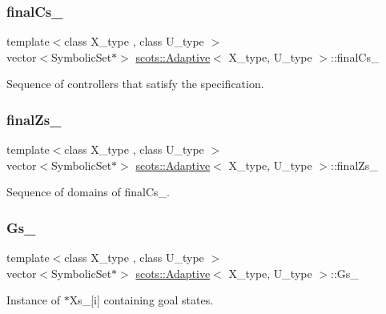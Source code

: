 \subsubsection{\texorpdfstring{final\+Cs\+\_\+}{finalCs\_}}
{\footnotesize\ttfamily template$<$class X\+\_\+type , class U\+\_\+type $>$ \\
vector$<$Symbolic\+Set$\ast$$>$ \hyperlink{classscots_1_1Adaptive}{scots\+::\+Adaptive}$<$ X\+\_\+type, U\+\_\+type $>$\+::final\+Cs\+\_\+}

Sequence of controllers that satisfy the specification. \mbox{\label{classscots_1_1Adaptive_af22209ae22c8b2dd921be22cc51a36dd}} 
\subsubsection{\texorpdfstring{final\+Zs\+\_\+}{finalZs\_}}
{\footnotesize\ttfamily template$<$class X\+\_\+type , class U\+\_\+type $>$ \\
vector$<$Symbolic\+Set$\ast$$>$ \hyperlink{classscots_1_1Adaptive}{scots\+::\+Adaptive}$<$ X\+\_\+type, U\+\_\+type $>$\+::final\+Zs\+\_\+}

Sequence of domains of final\+Cs\+\_\+. \mbox{\label{classscots_1_1Adaptive_a4184aca345cd09023c656bc616c2ee9a}} 
\subsubsection{\texorpdfstring{Gs\+\_\+}{Gs\_}}
{\footnotesize\ttfamily template$<$class X\+\_\+type , class U\+\_\+type $>$ \\
vector$<$Symbolic\+Set$\ast$$>$ \hyperlink{classscots_1_1Adaptive}{scots\+::\+Adaptive}$<$ X\+\_\+type, U\+\_\+type $>$\+::Gs\+\_\+}

Instance of $\ast$\+Xs\+\_\+\mbox{[}i\mbox{]} containing goal states. \mbox{\label{classscots_1_1Adaptive_ad197683891b126e16f0f377d778fd352}} 
